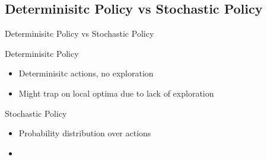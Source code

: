 \subsection{Determinisitc Policy vs Stochastic Policy}
\begin{frame}{Determinisitc Policy vs Stochastic Policy}
    \begin{block}{Determinisitc Policy}
        \begin{itemize}
        \item Determinisitc actions, no exploration
        \item \alert{Might trap on local optima due to lack of exploration}
    \end{itemize}
    \end{block}
    
    \begin{block}{Stochastic Policy}
        \begin{itemize}
        \item Probability distribution over actions
        \item \color{blue}{Avoid trap on local optima by  exploration}
    \end{itemize}
    \end{block}    
    
\end{frame}

